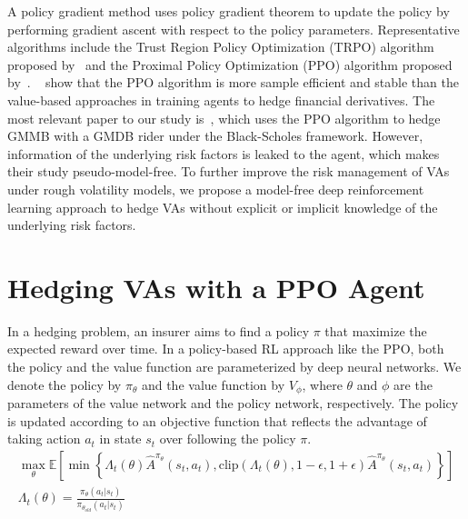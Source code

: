 A policy gradient method uses policy gradient theorem to update the policy by performing gradient ascent with respect to the policy parameters.
Representative algorithms include the Trust Region Policy Optimization (TRPO) algorithm proposed by~\cite{schulman2015trust} and the Proximal Policy Optimization (PPO) algorithm proposed by~\cite{schulman2017proximal}.
~\cite{du2020deep} show that the PPO algorithm is more sample efficient and stable than the value-based approaches in training agents to hedge financial derivatives.
The most relevant paper to our study is~\cite{chong2023pseudo}, which uses the PPO algorithm to hedge GMMB with a GMDB rider under the Black-Scholes framework.
However, information of the underlying risk factors is leaked to the agent, which makes their study pseudo-model-free.
To further improve the risk management of VAs under rough volatility models, we propose a model-free deep reinforcement learning approach to hedge VAs without explicit or implicit knowledge of the underlying risk factors.

\section{Hedging VAs with a PPO Agent}
In a hedging problem, an insurer aims to find a policy $\pi$ that maximize the expected reward over time.
In a policy-based RL approach like the PPO, both the policy and the value function are parameterized by deep neural networks.
We denote the policy by $\pi_{\theta}$ and the value function by $V_{\phi}$, where $\theta$ and $\phi$ are the parameters of the value network and the policy network, respectively.
The policy is updated according to an objective function that reflects the advantage of taking action $a_t$ in state $s_t$ over following the policy $\pi$.
\begin{align}
    \max_{\theta} \mathbb{E}\left[ \min \left\{ \Lambda_t(\theta)\hat{A}^{\pi_{\theta}}(s_t, a_t), \text{clip}(\Lambda_t(\theta), 1-\epsilon, 1 + \epsilon) \hat{A}^{\pi_{\theta}}(s_t, a_t)  \right\} \right] \\
    \Lambda_t(\theta) = \frac{\pi_{\theta}(a_t|s_t)}{\pi_{\theta_{old}}(a_t|s_t)} 
\end{align}

